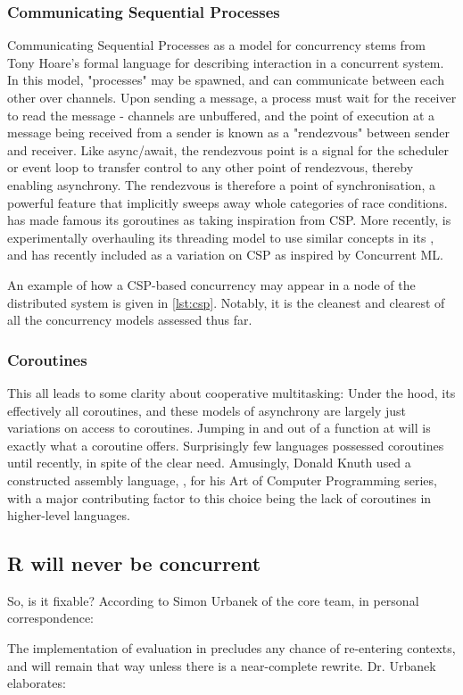 \subsubsection{Communicating Sequential Processes}

Communicating Sequential Processes as a model for concurrency stems from Tony Hoare's formal language for describing interaction in a concurrent system\cite{hoare1978communicating}.
In this model, "processes" may be spawned, and can communicate between each other over channels.
Upon sending a message, a process must wait for the receiver to read the message - channels are unbuffered, and the point of execution at a message being received from a sender is known as a "rendezvous" between sender and receiver.
Like async/await, the rendezvous point is a signal for the scheduler or event loop to transfer control to any other point of rendezvous, thereby enabling asynchrony.
The rendezvous is therefore a point of synchronisation, a powerful feature that implicitly sweeps away whole categories of race conditions.
 has made famous its goroutines as taking inspiration from CSP\cite{gomem2014}.
More recently,  is experimentally overhauling its threading model to use similar concepts in its , and  has recently included  as a variation on CSP as inspired by Concurrent ML.

An example of how a CSP-based concurrency may appear in a node of the distributed system is given in \cref{lst:csp}.
Notably, it is the cleanest and clearest of all the concurrency models assessed thus far.


\subsubsection{Coroutines}

This all leads to some clarity about cooperative multitasking: Under the hood, its effectively all coroutines, and these models of asynchrony are largely just variations on access to coroutines.
Jumping in and out of a function at will is exactly what a coroutine offers.
Surprisingly few languages possessed coroutines until recently, in spite of the clear need.
Amusingly, Donald Knuth used a constructed assembly language, , for his Art of Computer Programming series, with a major contributing factor to this choice being the lack of coroutines in higher-level languages\cite{knuth1}.

\subsection{R will never be concurrent}\label{sec:no}

So, is it fixable?
According to Simon Urbanek of the \R{} core team, in personal correspondence:


The implementation of evaluation in \R{} precludes any chance of re-entering contexts, and will remain that way unless there is a near-complete rewrite.
Dr.
Urbanek elaborates:

